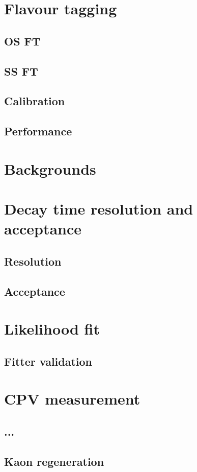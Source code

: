 \section{Flavour tagging}
\subsection{OS FT}
\subsection{SS FT}
\subsection{Calibration}
\subsection{Performance}
\section{Backgrounds}
\section{Decay time resolution and acceptance}
\subsection{Resolution}
\subsection{Acceptance}
\section{Likelihood fit}
\subsection{Fitter validation}
\section{CPV measurement}
\subsection{...}
\subsection{Kaon regeneration}
